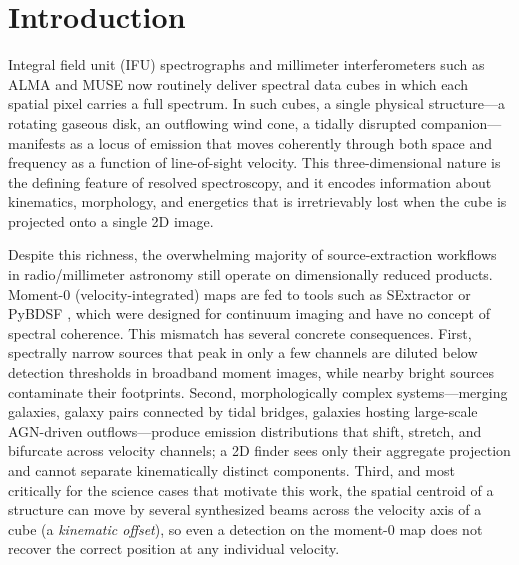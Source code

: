 \documentclass{aa}
\begin{document}


\maketitle

\section{Introduction}
\label{sec:intro}

Integral field unit (IFU) spectrographs and millimeter interferometers such as ALMA and MUSE now routinely deliver spectral data cubes in which each spatial pixel carries a full spectrum. In such cubes, a single physical structure---a rotating gaseous disk, an outflowing wind cone, a tidally disrupted companion---manifests as a locus of emission that moves coherently through both space and frequency as a function of line-of-sight velocity. This three-dimensional nature is the defining feature of resolved spectroscopy, and it encodes information about kinematics, morphology, and energetics that is irretrievably lost when the cube is projected onto a single 2D image.

Despite this richness, the overwhelming majority of source-extraction workflows in radio/millimeter astronomy still operate on dimensionally reduced products. Moment-0 (velocity-integrated) maps are fed to tools such as SExtractor \citep{...} or PyBDSF \citep{...}, which were designed for continuum imaging and have no concept of spectral coherence. This mismatch has several concrete consequences. First, spectrally narrow sources that peak in only a few channels are diluted below detection thresholds in broadband moment images, while nearby bright sources contaminate their footprints. Second, morphologically complex systems---merging galaxies, galaxy pairs connected by tidal bridges, galaxies hosting large-scale AGN-driven outflows---produce emission distributions that shift, stretch, and bifurcate across velocity channels; a 2D finder sees only their aggregate projection and cannot separate kinematically distinct components. Third, and most critically for the science cases that motivate this work, the spatial centroid of a structure can move by several synthesized beams across the velocity axis of a cube (a \emph{kinematic offset}), so even a detection on the moment-0 map does not recover the correct position at any individual velocity.
\end{document}
